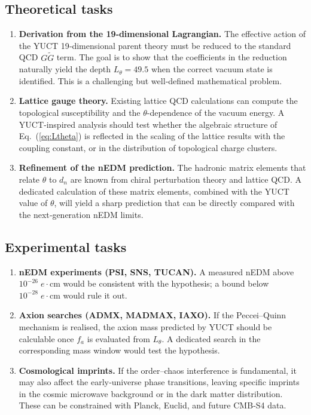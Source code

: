 \documentclass[12pt,a4paper]{article}
\begin{document}
	\subsection{Theoretical tasks}
	\begin{enumerate}
		\item \textbf{Derivation from the 19‑dimensional Lagrangian.}
		The effective action of the YUCT 19‑dimensional parent theory must be reduced to the standard QCD \(G\widetilde{G}\) term. The goal is to show that the coefficients in the reduction naturally yield the depth \(L_\theta = 49.5\) when the correct vacuum state is identified. This is a challenging but well‑defined mathematical problem.
		\item \textbf{Lattice gauge theory.}
		Existing lattice QCD calculations can compute the topological susceptibility and the \(\theta\)-dependence of the vacuum energy. A YUCT‑inspired analysis should test whether the algebraic structure of Eq.~(\ref{eq:Ltheta}) is reflected in the scaling of the lattice results with the coupling constant, or in the distribution of topological charge clusters.
		\item \textbf{Refinement of the nEDM prediction.}
		The hadronic matrix elements that relate \(\theta\) to \(d_n\) are known from chiral perturbation theory and lattice QCD. A dedicated calculation of these matrix elements, combined with the YUCT value of \(\theta\), will yield a sharp prediction that can be directly compared with the next‑generation nEDM limits.
	\end{enumerate}
	
	\subsection{Experimental tasks}
	\begin{enumerate}
		\item \textbf{nEDM experiments (PSI, SNS, TUCAN).}
		A measured nEDM above \(10^{-26}\;e\!\cdot\!\mathrm{cm}\) would be consistent with the hypothesis; a bound below \(10^{-28}\;e\!\cdot\!\mathrm{cm}\) would rule it out.
		\item \textbf{Axion searches (ADMX, MADMAX, IAXO).}
		If the Peccei–Quinn mechanism is realised, the axion mass predicted by YUCT should be calculable once \(f_a\) is evaluated from \(L_\theta\). A dedicated search in the corresponding mass window would test the hypothesis.
		\item \textbf{Cosmological imprints.}
		If the order–chaos interference is fundamental, it may also affect the early‑universe phase transitions, leaving specific imprints in the cosmic microwave background or in the dark matter distribution. These can be constrained with Planck, Euclid, and future CMB‑S4 data.
	\end{enumerate}
	
\end{document}
